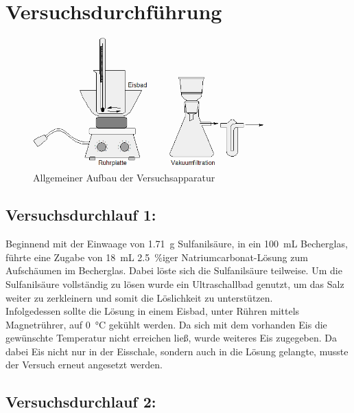 \section{Versuchsdurchführung}
\label{sec:durchfuerung}
\begin{figure}[h!]
	\centering
	\includegraphics[width=0.8\textwidth]{img/versuchsaufbau_1}
	\caption{Allgemeiner Aufbau der Versuchsapparatur}
	\label{fig:versuchsaufbau_1}
\end{figure}
\FloatBarrier

\subsection{Versuchsdurchlauf  1: }
Beginnend mit der Einwaage von \SI{1,71}{\gram} Sulfanilsäure, in ein \SI{100}{\milli \liter} Becherglas, führte eine Zugabe von \SI{18}{\milli \liter} \SI{2,5}{\percent}iger Natriumcarbonat-Lösung zum Aufschäumen im Becherglas.
Dabei löste sich die Sulfanilsäure teilweise. Um die Sulfanilsäure vollständig zu lösen wurde ein Ultraschallbad genutzt, um das Salz weiter zu zerkleinern und somit die Löslichkeit zu unterstützen.\\
Infolgedessen sollte die Lösung in einem Eisbad, unter Rühren mittels Magnetrührer, auf \SI{0}{\celsius} gekühlt werden. Da sich mit dem vorhanden Eis die gewünschte Temperatur nicht erreichen ließ, wurde weiteres Eis zugegeben. Da dabei Eis nicht nur in der Eisschale, sondern auch in die Lösung gelangte, musste der Versuch erneut angesetzt werden.

\subsection{Versuchsdurchlauf 2: }
